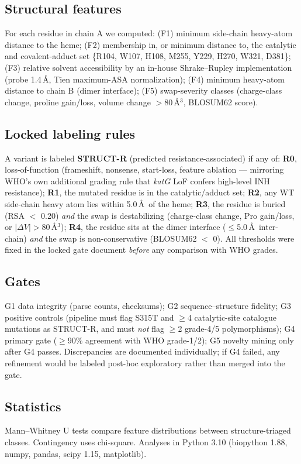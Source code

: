 \documentclass[11pt]{article}
\begin{document}
\subsection{Structural features}
For each residue in chain A we computed: (F1) minimum side-chain heavy-atom distance to the heme; (F2) membership in, or minimum distance to, the catalytic and covalent-adduct set \{R104, W107, H108, M255, Y229, H270, W321, D381\}; (F3) relative solvent accessibility by an in-house Shrake--Rupley implementation (probe 1.4\,\AA, Tien maximum-ASA normalization); (F4) minimum heavy-atom distance to chain B (dimer interface); (F5) swap-severity classes (charge-class change, proline gain/loss, volume change $>$80\,\AA$^3$, BLOSUM62 score).

\subsection{Locked labeling rules}
A variant is labeled \textbf{STRUCT-R} (predicted resistance-associated) if any of: \textbf{R0}, loss-of-function (frameshift, nonsense, start-loss, feature ablation --- mirroring WHO's own additional grading rule that \textit{katG} LoF confers high-level INH resistance); \textbf{R1}, the mutated residue is in the catalytic/adduct set; \textbf{R2}, any WT side-chain heavy atom lies within 5.0\,\AA\ of the heme; \textbf{R3}, the residue is buried (RSA $<$ 0.20) \emph{and} the swap is destabilizing (charge-class change, Pro gain/loss, or $|\Delta V|>80$\,\AA$^3$); \textbf{R4}, the residue sits at the dimer interface ($\leq$5.0\,\AA\ inter-chain) \emph{and} the swap is non-conservative (BLOSUM62 $<$ 0). All thresholds were fixed in the locked gate document \emph{before} any comparison with WHO grades.

\subsection{Gates}
G1 data integrity (parse counts, checksums); G2 sequence--structure fidelity; G3 positive controls (pipeline must flag S315T and $\geq$4 catalytic-site catalogue mutations as STRUCT-R, and must \emph{not} flag $\geq$2 grade-4/5 polymorphisms); G4 primary gate ($\geq$90\% agreement with WHO grade-1/2); G5 novelty mining only after G4 passes. Discrepancies are documented individually; if G4 failed, any refinement would be labeled post-hoc exploratory rather than merged into the gate.

\subsection{Statistics}
Mann--Whitney U tests compare feature distributions between structure-triaged classes. Contingency uses chi-square. Analyses in Python 3.10 (biopython 1.88, numpy, pandas, scipy 1.15, matplotlib).
\end{document}
